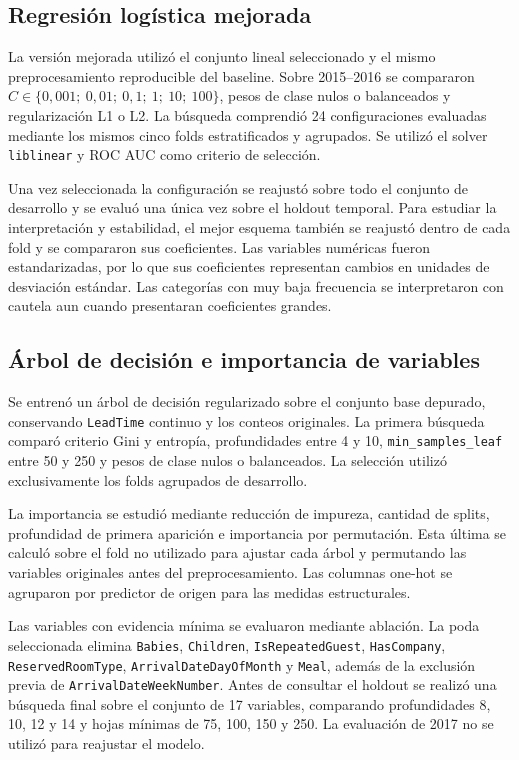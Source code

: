 \subsection{Regresión logística mejorada}

La versión mejorada utilizó el conjunto lineal seleccionado y el mismo
preprocesamiento reproducible del baseline. Sobre 2015--2016 se compararon
$C\in\{0{,}001;\ 0{,}01;\ 0{,}1;\ 1;\ 10;\ 100\}$, pesos de clase nulos o balanceados y
regularización L1 o L2. La búsqueda comprendió 24 configuraciones evaluadas
mediante los mismos cinco folds estratificados y agrupados. Se utilizó el
solver \texttt{liblinear} y ROC AUC como criterio de selección.

Una vez seleccionada la configuración se reajustó sobre todo el conjunto de
desarrollo y se evaluó una única vez sobre el holdout temporal. Para estudiar
la interpretación y estabilidad, el mejor esquema también se reajustó dentro
de cada fold y se compararon sus coeficientes. Las variables numéricas fueron
estandarizadas, por lo que sus coeficientes representan cambios en unidades de
desviación estándar. Las categorías con muy baja frecuencia se interpretaron
con cautela aun cuando presentaran coeficientes grandes.

\subsection{Árbol de decisión e importancia de variables}

Se entrenó un árbol de decisión regularizado sobre el conjunto base depurado,
conservando \texttt{LeadTime} continuo y los conteos originales. La primera
búsqueda comparó criterio Gini y entropía, profundidades entre 4 y 10,
\texttt{min\_samples\_leaf} entre 50 y 250 y pesos de clase nulos o
balanceados. La selección utilizó exclusivamente los folds agrupados de
desarrollo.

La importancia se estudió mediante reducción de impureza, cantidad de splits,
profundidad de primera aparición e importancia por permutación. Esta última se
calculó sobre el fold no utilizado para ajustar cada árbol y permutando las
variables originales antes del preprocesamiento. Las columnas one-hot se
agruparon por predictor de origen para las medidas estructurales.

Las variables con evidencia mínima se evaluaron mediante ablación. La poda
seleccionada elimina \texttt{Babies}, \texttt{Children},
\texttt{IsRepeatedGuest}, \texttt{HasCompany}, \texttt{ReservedRoomType},
\texttt{ArrivalDateDayOfMonth} y \texttt{Meal}, además de la exclusión previa
de \texttt{ArrivalDateWeekNumber}. Antes de consultar el holdout se realizó
una búsqueda final sobre el conjunto de 17 variables, comparando profundidades
8, 10, 12 y 14 y hojas mínimas de 75, 100, 150 y 250. La evaluación de 2017 no
se utilizó para reajustar el modelo.

